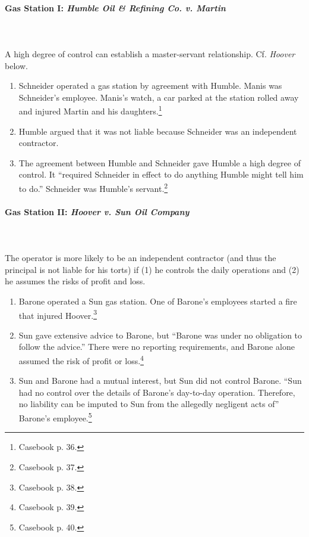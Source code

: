 \paragraph{Gas Station I: \emph{Humble Oil \& Refining Co. v. Martin}}
~\\\\
A high degree of control can establish a master-servant relationship. Cf. 
\emph{Hoover} below.

\begin{enumerate}
    \item Schneider operated a gas station by agreement with Humble. Manis was 
    Schneider's employee. Manis's watch, a car parked at the station rolled 
    away and injured Martin and his daughters.\footnote{Casebook p. 36.}
    \item Humble argued that it was not liable because Schneider was an 
    independent contractor.
    \item The agreement between Humble and Schneider gave Humble a high degree 
    of control. It ``required Schneider in effect to do anything Humble might 
    tell him to do.'' Schneider was Humble's servant.\footnote{Casebook p. 37.}
\end{enumerate}

\paragraph{Gas Station II: \emph{Hoover v. Sun Oil Company}}
~\\\\
The operator is more likely to be an independent contractor (and thus the 
principal is not liable for his torts) if (1) he controls the daily operations 
and (2) he assumes the risks of profit and loss.

\begin{enumerate}
    \item Barone operated a Sun gas station. One of Barone's employees started 
    a fire that injured Hoover.\footnote{Casebook p. 38.}
    \item Sun gave extensive advice to Barone, but ``Barone was under no 
    obligation to follow the advice.'' There were no reporting requirements, 
    and Barone alone assumed the risk of profit or loss.\footnote{Casebook p. 
    39.}
    \item Sun and Barone had a mutual interest, but Sun did not control 
    Barone. ``Sun had no control over the details of Barone's day-to-day 
    operation. Therefore, no liability can be imputed to Sun from the 
    allegedly negligent acts of'' Barone's employee.\footnote{Casebook p. 40.}
\end{enumerate}

